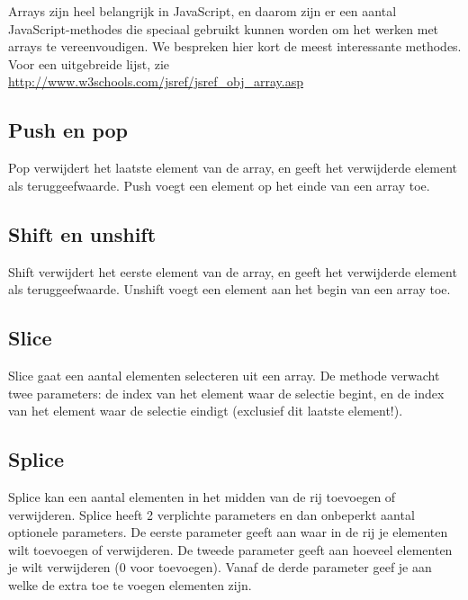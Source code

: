 Arrays zijn heel belangrijk in JavaScript, en daarom zijn er een aantal JavaScript-methodes die speciaal gebruikt kunnen worden om het werken met arrays te vereenvoudigen. We bespreken hier kort de meest interessante methodes. Voor een uitgebreide lijst, zie \url{http://www.w3schools.com/jsref/jsref_obj_array.asp}

\subsection{Push en pop}

Pop verwijdert het laatste element van de array, en geeft het verwijderde element als teruggeefwaarde. Push voegt een element op het einde van een array toe.



\subsection{Shift en unshift}

Shift verwijdert het eerste element van de array, en geeft het verwijderde element als teruggeefwaarde. Unshift voegt een element aan het begin van een array toe.



\subsection{Slice}

Slice gaat een aantal elementen selecteren uit een array. De methode verwacht twee parameters: de index van het element waar de selectie begint, en de index van het element waar de selectie eindigt (exclusief dit laatste element!).



\subsection{Splice}

Splice kan een aantal elementen in het midden van de rij toevoegen of verwijderen. Splice heeft 2 verplichte parameters en dan onbeperkt aantal optionele parameters. De eerste parameter geeft aan waar in de rij je elementen wilt toevoegen of verwijderen. De tweede parameter geeft aan hoeveel elementen je wilt verwijderen (0 voor toevoegen). Vanaf de derde parameter geef je aan welke de extra toe te voegen elementen zijn.

